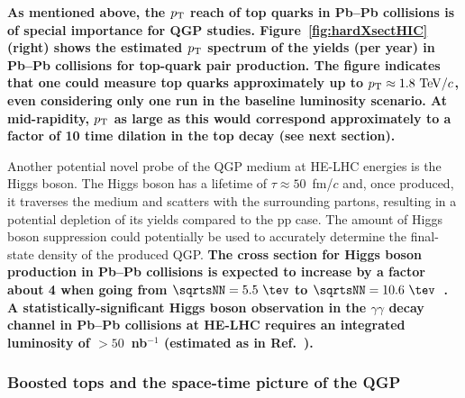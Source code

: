 \documentclass[../report.tex]{subfiles}
\begin{document}
{\bf As mentioned above, the $p_{\rm T}$ reach of top quarks in Pb--Pb collisions is of special importance for QGP
studies. Figure~\ref{fig:hardXsectHIC} (right) shows the estimated $p_{\rm T}$ spectrum
of the yields (per year) in Pb--Pb collisions for top-quark pair production. The figure indicates that one
could measure top quarks approximately up to $p_{\rm T} \approx
1.8~{\rm TeV}/c$, even considering only one run in the baseline
luminosity scenario. At mid-rapidity, $p_{\rm T}$ as large
as this would correspond approximately to a factor of 10 time dilation
in the top decay (see next section). }

Another potential novel probe of the QGP medium at HE-LHC energies is the
Higgs boson. The Higgs boson has a lifetime of $\tau\approx 50$~fm/$c$
and, once produced, it traverses the medium and scatters with the
surrounding partons, 
resulting in a potential depletion of its yields compared to the pp
case. 
The amount of Higgs boson suppression could potentially be used 
to accurately determine the final-state density of the produced QGP.
{\bf The cross section for Higgs boson production in Pb--Pb collisions is expected to
increase by a factor about 4 when going from
$\sqrtsNN=5.5~\tev$ to $\sqrtsNN=10.6~\tev$~\cite{dEnterria:2017jyt}.
A statistically-significant Higgs boson observation in the
$\gamma\gamma$ decay channel in Pb--Pb collisions at HE-LHC 
requires an integrated luminosity of $>50$~nb$^{-1}$ 
(estimated as in Ref.~\cite{dEnterria:2017jyt}).}


\subsubsection{Boosted tops and the space-time picture of the QGP}
\label{sec:HE_boostedtops}
\end{document}
